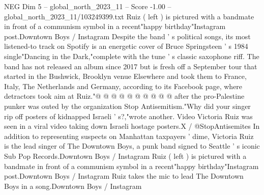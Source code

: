\begin{textsample}{NEG Dim 5 – global\_north\_2023\_11 – Score -1.00 – global\_north\_2023\_11/103249399.txt}
Ruiz ( left ) is pictured with a bandmate in front of a communism symbol in a recent"happy birthday"Instagram post.Downtown Boys / Instagram Despite the band ' s political songs, its most listened-to track on Spotify is an energetic cover of Bruce Springsteen ' s 1984 single"Dancing in the Dark,"complete with the tune ' s classic saxophone riff.
The band has not released an album since 2017 but is fresh off a September tour that started in the Bushwick, Brooklyn venue Elsewhere and took them to France, Italy, The Netherlands and Germany, according to its Facebook page, where detractors took aim at Ruiz."@ @ @ @ @ @ @ @ @ @ after the pro-Palestine punker was outed by the organization Stop Antisemitism."Why did your singer rip off posters of kidnapped Israeli ' s?,"wrote another.
Video Victoria Ruiz was seen in a viral video taking down Israeli hostage posters.X / @StopAntisemites In addition to representing suspects on Manhattan taxpayers ' dime, Victoria Ruiz is the lead singer of The Downtown Boys, a punk band signed to Seattle ' s iconic Sub Pop Records.Downtown Boys / Instagram Ruiz ( left ) is pictured with a bandmate in front of a communism symbol in a recent"happy birthday"Instagram post.Downtown Boys / Instagram Ruiz takes the mic to lead The Downtown Boys in a song.Downtown Boys / Instagram

\end{textsample}
